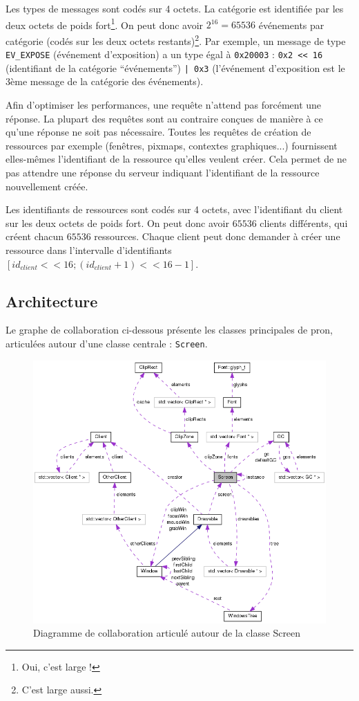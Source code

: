 \vspace{1em}

Les types de messages sont codés sur 4 octets. La catégorie est identifiée par les deux octets de poids fort\footnote{Oui, c'est large !}. On peut donc avoir $2^{16} = 65536$ événements par catégorie (codés sur les deux octets restants)\footnote{C'est large aussi.}. Par exemple, un message de type \verb|EV_EXPOSE| (événement d'exposition) a un type égal à \verb|0x20003| : \verb|0x2 << 16| (identifiant de la catégorie ``événements'') \verb=| 0x3= (l'événement d'exposition est le 3ème message de la catégorie des événements).

Afin d'optimiser les performances, une requête n'attend pas forcément une réponse. La plupart des requêtes sont au contraire conçues de manière à ce qu'une réponse ne soit pas nécessaire. Toutes les requêtes de création de ressources par exemple (fenêtres, pixmaps, contextes graphiques...) fournissent elles-mêmes l'identifiant de la ressource qu'elles veulent créer. Cela permet de ne pas attendre une réponse du serveur indiquant l'identifiant de la ressource nouvellement créée.

Les identifiants de ressources sont codés sur 4 octets, avec l'identifiant du client sur les deux octets de poids fort. On peut donc avoir $65536$ clients différents, qui créent chacun $65536$ ressources. Chaque client peut donc demander à créer une ressource dans l'intervalle d'identifiants $[id_{client} << 16 ; (id_{client} + 1) << 16 - 1]$.

\subsection{Architecture}

Le graphe de collaboration ci-dessous présente les classes principales de pron, articulées autour d'une classe centrale : \verb|Screen|.

\begin{figure}[H]
  \centering
  \includegraphics[width=14cm]{images/collab_screen.png}
  \caption{Diagramme de collaboration articulé autour de la classe Screen}
\end{figure}

